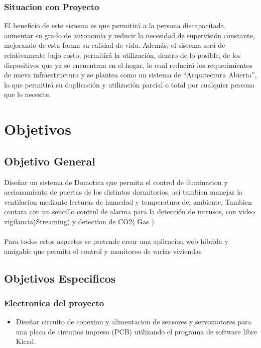 \documentclass[letterpaper,12pt]{article}
\begin{document}
{\subsubsection{Situacion con Proyecto}
El beneficio de este sistema es que permitirá a la persona discapacitada, aumentar su grado de autonomía y reducir la necesidad de supervisión constante, mejorando de esta forma su calidad de vida.  Además, el sistema será de relativamente bajo costo, permitirá la utilización, dentro de lo posible, de los dispositivos que ya se encuentran en el hogar, lo cual reducirá los requerimientos de nueva infraestructura y se plantea como un sistema de “Arquitectura Abierta”, lo que permitirá su duplicación y  utilización parcial o total por cualquier persona que lo necesite. 




\section{Objetivos}




\subsection{Objetivo General}

Diseñar un sistema de Domotica que permita el control de  iluminacion y accionamiento de puertas de los distintos dormitorios.
asi tambien manejar la ventilacion mediante lecturas de humedad y temperatura del ambiente, Tambien contara con un sencillo control de alarma para la detección de intrusos, con video vigilancia(Streaming)  y detection de CO2( Gas )\\\\
Para todos estos aspectos se pretende crear una aplicacion web hibrida y amigable que permita el control y monitoreo de varias viviendas


\subsection{Objetivos Especificos}

\subsubsection{Electronica del proyecto}

\begin{itemize}
	
	\item Diseñar circuito de conexion y alimentacion de sensores y servomotores para una placa de circuitos impreso (PCB) utilizando el programa de software libre Kicad.
	

\end{itemize}}
\end{document}
